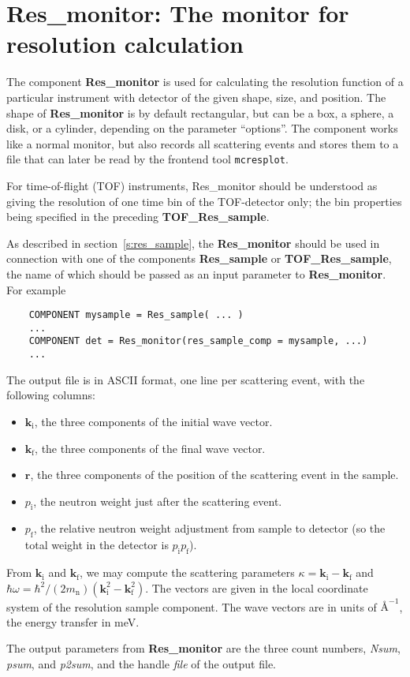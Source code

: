 \section{Res\_monitor: The monitor for resolution calculation}
\label{s:res_monitor}


The component \textbf{Res\_monitor} is used for calculating the
resolution function of a particular instrument with detector of the
given shape, size, and position.
The shape of \textbf{Res\_monitor} is by default rectangular,
but can be a box, a sphere, a disk, or a cylinder,
depending on the parameter ``options''.
The component works like a normal monitor, but
also records all scattering events and stores
them to a file that can later be read by 
the \MCS frontend tool \verb+mcresplot+.

For time-of-flight (TOF) instruments, {Res\_monitor} should be understood 
as giving the resolution of one time bin of the TOF-detector only; 
the bin properties being specified in the preceding \textbf{TOF\_Res\_sample}.

As described in section~\ref{s:res_sample},
the \textbf{Res\_monitor} should be used in connection with one of the
components \textbf{Res\_sample} or \textbf{TOF\_Res\_sample}, 
the name of which should be passed as an
input parameter to \textbf{Res\_monitor}. For example
\begin{lstlisting}
    COMPONENT mysample = Res_sample( ... )
    ...
    COMPONENT det = Res_monitor(res_sample_comp = mysample, ...)
    ...
\end{lstlisting}

The output file is in ASCII format, one line per scattering event, with
the following columns:
\begin{itemize}
\item $\textbf{k}_\textrm{i}$, the three components of the initial wave vector.
\item $\textbf{k}_\textrm{f}$, the three components of the final wave vector.
\item $\textbf{r}$, the three components of the position of the scattering
  event in the sample.
\item $p_\textrm{i}$, the neutron weight just after the scattering event.
\item $p_\textrm{f}$, the relative neutron weight adjustment from sample to
  detector (so the total weight in the detector is $p_\textrm{i}p_\textrm{f}$).
\end{itemize}
From $\textbf{k}_\textrm{i}$ and $\textbf{k}_\textrm{f}$, we may compute 
the scattering parameters 
$\kappa = \textbf{k}_\textrm{i} - \textbf{k}_\textrm{f}$ and 
$\hbar \omega = \hbar^2/(2 m_\textrm{n})(\textbf{k}_\textrm{i}^2 - \textbf{k}_\textrm{f}^2)$.
The vectors are given in the local coordinate system of the resolution
sample component. The wave vectors are in units of $\mbox{\AA}^{-1}$, the
energy transfer in meV.

The output parameters from \textbf{Res\_monitor}
are the three count numbers, \textit{Nsum}, \textit{psum},
and \textit{p2sum}, and the handle \textit{file} of the output file.
